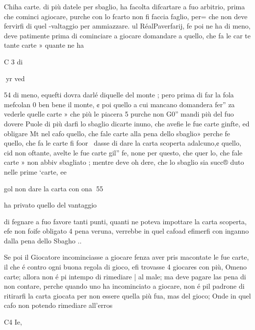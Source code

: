 \documentclass[11pt,a6paper]{article}
\begin{document}
Chiha carte. di più datele per
sbaglio, ha facolta difcartare
a fuo arbitrio, prima che cominci agiocare, purche con lo
fcarto non fi faccia faglio, per=
che non deve fervirfi di quel
-valtaggio per ammiazzare. ul
RéalPaverfarij, fe poi ne ha di
meno, deve patimente prima
di cominciare a giocare domandare a quello, che fa le car
te tante carte » quante ne ha

C 3 di

 

 

 

 
yr ved

 

 

 

 

 

54
di meno, equefti dovra darlé
diquelle del monte ; pero prima di far la fola mefcolan 0
ben bene il monte, ¢ poi quello
a cui mancano domandera fer”
za vederle quelle carte » che
più le piacera 5 purche non G0”
mandi più del fuo dovere Puole di più darfi lo sbaglio
dicarte inuno, che avefie le
fue carte ginfte, ed obligare Mt
nel cafo quello, che fale carte
alla pena dello sbaglio» perche
fe quello, che fa le carte fi foor~
dasse di dare la carta scoperta
adalcuno,¢ quello, cid non
oftante, avelte le fue carte gil”
fe, none per questo, che quer
lo, che fale carte » non abbiv
sbagliato ; mentre deve oh
dere, che lo sbaglio sia succ®
duto nelle prime ‘carte, ee

gol non dare la carta con
ona
55

ha privato quello del vantaggio

di fegnare a fuo favore tanti
punti, quanti ne poteva impottare la carta scoperta, efe non
foife obligato 4 pena veruna,
verrebbe in quel cafoad efimerfi con inganno dalla pena dello
Sbagho ..

Se poi il Giocatore incominciasse a giocare fenza aver pris
macontate le fue carte, il che
é contro ogni buona regola di
gioco, efi trovasse 4 giocares
con più, Omeno carte; allora
non é pi intempo di rimediare |
al male; ma deve pagare las
pena di non contare, perche
quando uno ha incominciato a
giocare, non é pil padrone di
ritirarfi la carta giocata per
non essere quella più fua, mas
del gioco; Onde in quel cafo
non potendo rimediare all’erros

C4 Ie,

 

 

 
\end{document}
